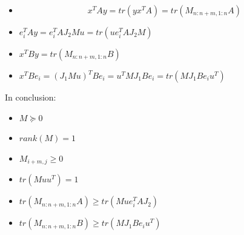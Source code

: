 \documentclass[11pt]{article}
\begin{document}
\begin{itemize}
\item $$x^TAy = tr(yx^TA) = tr(M_{n:n+m, 1:n} A)$$
\item \(e_i^TAy = e_i^TAJ_2Mu = tr(ue_i^T AJ_2 M)\)
\item \(x^TBy = tr(M_{n:n+m, 1:n} B)\)
\item \(x^TBe_i = (J_1Mu)^TBe_i = u^TMJ_1Be_i = tr(M J_1Be_iu^T)\)
\end{itemize}

In conclusion:
\begin{itemize}
\item \(M \succeq 0\)
\item \(rank(M) = 1\)
\item \(M_{i+m, j} \ge 0\)
\item \(tr(M uu^T) = 1\)
\item \(tr(M_{n:n+m, 1:n} A) \ge tr(M ue_i^TAJ_2)\)
\item \(tr(M_{n:n+m, 1:n} B) \ge tr(M J_1Be_iu^T)\)
\end{itemize}
\end{document}
